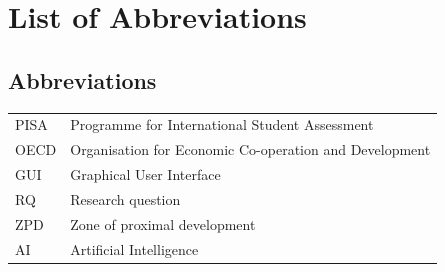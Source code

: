 \chapter*{List of Abbreviations}

\section*{Abbreviations}
\begin{tabular}{p{1.5cm}p{10cm}}
PISA & Programme for International Student Assessment \\
OECD & Organisation for Economic Co-operation and Development \\
GUI & Graphical User Interface \\
RQ & Research question \\ 
ZPD & Zone of proximal development \\
AI & Artificial Intelligence
\end{tabular}
